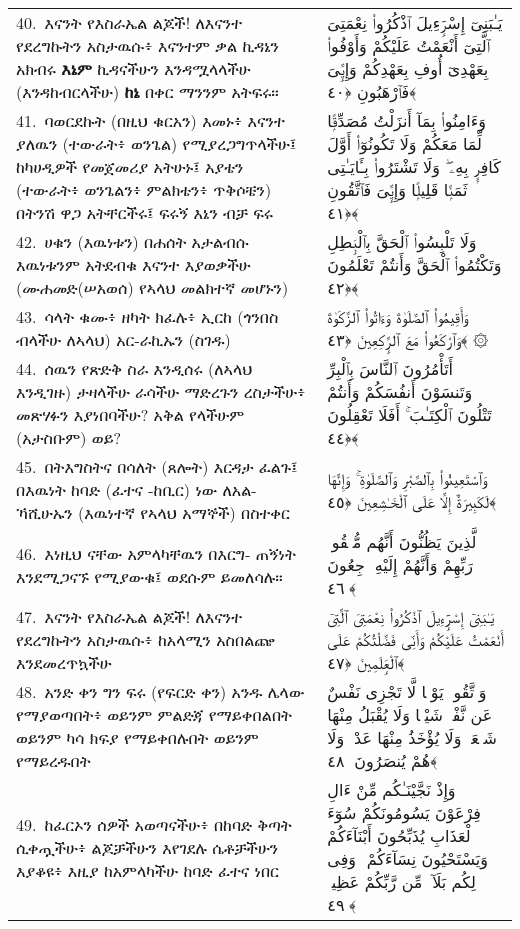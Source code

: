 \documentclass[11pt,a4paper,oneside]{article}%
\newcommand{\mytextarabic}[1]{\textarabic{ #1 \flushright}}
\begin{document}
\begin{longtable}{%
  @{}
    p{}
  @{~~~}
    p{}
    @{}
}
40.\ እናንት የእስራኤል ልጆች! ለእናንተ የደረግኩትን አስታዉሱ፥ እናንተም ቃል ኪዳኔን አክብሩ  {\bf እኔም} ኪዳናችሁን እንዳሟላላችሁ (እንዳከብርላችሁ)  {\bf ከኔ} በቀር ማንንም አትፍሩ። &  \mytextarabic{يَـٰبَنِىٓ إِسْرَٟٓءِيلَ ٱذْكُرُوا۟ نِعْمَتِىَ ٱلَّتِىٓ أَنْعَمْتُ عَلَيْكُمْ وَأَوْفُوا۟ بِعَهْدِىٓ أُوفِ بِعَهْدِكُمْ وَإِيَّٟىَ فَٱرْهَبُونِ ﴿٤٠﴾}\\ 
41.\ ባወርደኩት (በዚህ ቁርአን) እመኑ፥ እናንተ ያለዉን (ተውራት፥ ወንጌል) የሚያረጋግጥላችሁ፤  ከካሀዲዎች የመጀመሪያ አትሁኑ፤ አያቴን  (ተውራት፥ ወንጌልን፥ ምልክቴን፥ ጥቅሶቼን) በትንሽ  ዋጋ አትቸርችሩ፤ ፍሩኝ እኔን ብቻ ፍሩ &  \mytextarabic{وَءَامِنُوا۟ بِمَآ أَنزَلْتُ مُصَدِّقًۭا لِّمَا مَعَكُمْ وَلَا تَكُونُوٓا۟ أَوَّلَ كَافِرٍۭ بِهِۦ ۖ وَلَا تَشْتَرُوا۟ بِـَٔايَـٰتِى ثَمَنًۭا قَلِيلًۭا وَإِيَّٟىَ فَٱتَّقُونِ ﴿٤١﴾}\\
42.\ ሀቁን (እዉነቱን) በሐሰት አታልብሱ እዉነቱንም አትደብቁ እናንተ እያወቃችሁ (ሙሐመድ(ሠአወሰ) የኣላህ መልክተኛ መሆኑን) &  \mytextarabic{وَلَا تَلْبِسُوا۟ ٱلْحَقَّ بِٱلْبَٟطِلِ وَتَكْتُمُوا۟ ٱلْحَقَّ وَأَنتُمْ تَعْلَمُونَ ﴿٤٢﴾}\\
43.\ ሳላት ቁሙ፥ ዘካት ክፈሉ፥ ኢርከ (ጎንበስ ብላችሁ ለኣላህ) አር-ራኪኡን (ስገዱ) &  \mytextarabic{وَأَقِيمُوا۟ ٱلصَّلَوٰةَ وَءَاتُوا۟ ٱلزَّكَوٰةَ وَٱرْكَعُوا۟ مَعَ ٱلرَّٟكِعِينَ ﴿٤٣﴾ ۞}\\
44.\ ሰዉን የጽድቅ ስራ እንዲሰሩ (ለኣላህ እንዲገዙ) ታዛላችሁ ራሳችሁ ማድረጉን ረስታችሁ፥ መጽሃፉን እያነበባችሁ? አቅል የላችሁም (አታስቡም) ወይ? &  \mytextarabic{ أَتَأْمُرُونَ ٱلنَّاسَ بِٱلْبِرِّ وَتَنسَوْنَ أَنفُسَكُمْ وَأَنتُمْ تَتْلُونَ ٱلْكِتَـٰبَ ۚ أَفَلَا تَعْقِلُونَ ﴿٤٤﴾}\\
45.\ በትእግስትና በሳለት (ጸሎት) እርዳታ ፈልጉ፤ በእዉነት ከባድ (ፈተና -ከቢር) ነው ለአል-ኻሺሁኡን (እዉነተኛ የኣላህ  አማኞች) በስተቀር &  \mytextarabic{ وَٱسْتَعِينُوا۟ بِٱلصَّبْرِ وَٱلصَّلَوٰةِ ۚ وَإِنَّهَا لَكَبِيرَةٌ إِلَّا عَلَى ٱلْخَـٰشِعِينَ ﴿٤٥﴾}\\
46.\ እነዚህ ናቸው አምላካቸዉን በእርግ- ጠኝነት እንደሚጋናኙ የሚያውቁ፤ ወደሱም ይመለሳሉ። &  \mytextarabic{ٱلَّذِينَ يَظُنُّونَ أَنَّهُم مُّلَٟقُوا۟ رَبِّهِمْ وَأَنَّهُمْ إِلَيْهِ رَٟجِعُونَ ﴿٤٦﴾}\\
47.\ እናንት የእስራኤል ልጆች! ለእናንተ የደረግኩትን አስታዉሱ፥ ከአላሚን አስበልጬ እንደመረጥኳችሁ &  \mytextarabic{يَـٰبَنِىٓ إِسْرَٟٓءِيلَ ٱذْكُرُوا۟ نِعْمَتِىَ ٱلَّتِىٓ أَنْعَمْتُ عَلَيْكُمْ وَأَنِّى فَضَّلْتُكُمْ عَلَى ٱلْعَٟلَمِينَ ﴿٤٧﴾}\\
48.\ አንድ ቀን ግን ፍሩ (የፍርድ ቀን) አንዱ ሌላው የማያወጣበት፥ ወይንም ምልድጃ የማይቀበልበት ወይንም ካሳ ክፍያ የማይቀበሉበት ወይንም የማይረዱበት &  \mytextarabic{وَٱتَّقُوا۟ يَوْمًۭا لَّا تَجْزِى نَفْسٌ عَن نَّفْسٍۢ شَيْـًۭٔا وَلَا يُقْبَلُ مِنْهَا شَفَٟعَةٌۭ وَلَا يُؤْخَذُ مِنْهَا عَدْلٌۭ وَلَا هُمْ يُنصَرُونَ ﴿٤٨﴾}\\
49.\ ከፈርኦን ሰዎች አወጣናችሁ፥ በከባድ  ቅጣት ሲቀጧችሁ፥ ልጆቻችሁን እየገደሉ ሴቶቻችሁን እያቆዩ፥ እዚያ ከአምላካችሁ  ከባድ ፈተና ነበር &  \mytextarabic{وَإِذْ نَجَّيْنَـٰكُم مِّنْ ءَالِ فِرْعَوْنَ يَسُومُونَكُمْ سُوٓءَ ٱلْعَذَابِ يُذَبِّحُونَ أَبْنَآءَكُمْ وَيَسْتَحْيُونَ نِسَآءَكُمْ ۚ وَفِى ذَٟلِكُم بَلَآءٌۭ مِّن رَّبِّكُمْ عَظِيمٌۭ ﴿٤٩﴾}\\

\end{longtable}
\end{document}
